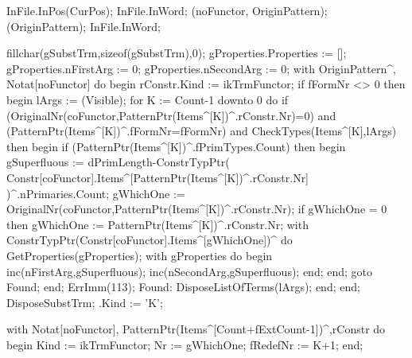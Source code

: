    InFile.InPos(CurPos);
   InFile.InWord;
   (noFunctor, OriginPattern);
   (OriginPattern);
   InFile.InWord;
   
   fillchar(gSubstTrm,sizeof(gSubstTrm),0);
   gProperties.Properties := [];
   gProperties.nFirstArg := 0;
   gProperties.nSecondArg := 0;
   with OriginPattern^, Notat[noFunctor] do
   begin
      rConstr.Kind := ikTrmFunctor;
      if fFormNr <> 0 then
      begin
         lArgs := (Visible);
         for K := Count-1 downto 0 do
            if (OriginalNr(coFunctor,PatternPtr(Items^[K])^.rConstr.Nr)=0) and
                  (PatternPtr(Items^[K])^.fFormNr=fFormNr) and
                  CheckTypes(Items^[K],lArgs) then
            begin
               if (PatternPtr(Items^[K])^.fPrimTypes.Count) then
               begin
                  gSuperfluous := dPrimLength-ConstrTypPtr(
                     Constr[coFunctor].Items^[PatternPtr(Items^[K])^.rConstr.Nr]
                                                          )^.nPrimaries.Count;
                  gWhichOne := OriginalNr(coFunctor,PatternPtr(Items^[K])^.rConstr.Nr);
                  if gWhichOne = 0 then
                     gWhichOne := PatternPtr(Items^[K])^.rConstr.Nr;
                  with ConstrTypPtr(Constr[coFunctor].Items^[gWhichOne])^ do
                     GetProperties(gProperties);
                  with gProperties do
                  begin
                     inc(nFirstArg,gSuperfluous);
                     inc(nSecondArg,gSuperfluous);
                  end;
               end;
               goto Found;
            end;
         ErrImm(113);
         Found:
            DisposeListOfTerms(lArgs);
      end;
   end;
   DisposeSubstTrm;
   .Kind := 'K';
   
   with Notat[noFunctor], PatternPtr(Items^[Count+fExtCount-1])^,rConstr do
   begin
      Kind := ikTrmFunctor;
      Nr := gWhichOne;
      fRedefNr :=  K+1;
   end;
   
